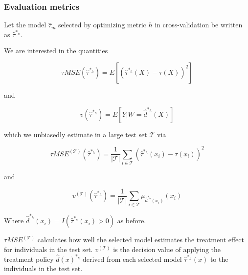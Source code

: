 \subsubsection{Evaluation metrics}

Let the model $\hat\tau_m$ selected by optimizing metric $h$ in cross-validation be written as $\hat\tau^{*_h}$. 

We are interested in the quantities

\[
\tau MSE(\hat\tau^{*_h}) = E[ (\hat\tau^{*_h} (X) - \tau(X))^2 ]
\]

and 

\[
v(\hat\tau^{*_h}) = E[ Y| W =\hat d^{*_h} (X)]
\]

which we unbiasedly estimate in a large test set $\mathcal{T}$ via

\begin{equation}
\label{true-mse}
\tau MSE^{(\mathcal{T})}(\hat\tau^{*_h}) = \frac{1}{|\mathcal{T}|}\sum_{i \in \mathcal{T}} (\hat\tau^{*_h} (x_i) - \tau(x_i))^2
\end{equation}

and 

\begin{equation}
\label{true-value}
v^{(\mathcal{T})}(\hat\tau^{*_h}) = \frac{1}{|\mathcal{T}|}\sum_{i \in \mathcal{T}} \mu_{\hat d^{*_h}(x_i)}(x_i)
\end{equation}

Where $\hat d^{*_h}(x_i) = I(\hat\tau^{*_h}(x_i) > 0)$ as before. 

$\tau MSE^{(\mathcal{T})}$ calculates how well the selected model estimates the treatment effect for individuals in the test set. $v^{(\mathcal{T})}$ is the decision value of applying the treatment policy $\hat d(x)^{*_h}$ derived from each selected model $\hat \tau^{*_h} (x)$ to the individuals in the test set.

